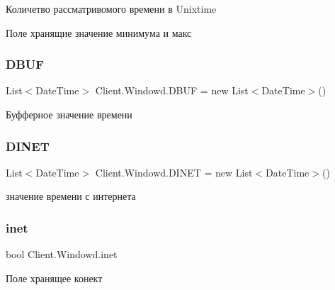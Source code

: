 Количетво рассматривомого времени в Unixtime 

Поле хранящие значение минимума и макс \hypertarget{class_client_1_1_windowd_ae56192c0587527c76b5878d3239768e4}{}\label{class_client_1_1_windowd_ae56192c0587527c76b5878d3239768e4} 
\subsubsection{\texorpdfstring{D\+B\+UF}{DBUF}}
{\footnotesize\ttfamily List$<$Date\+Time$>$ Client.\+Windowd.\+D\+B\+UF = new List$<$Date\+Time$>$()}



Буфферное значение времени 

\hypertarget{class_client_1_1_windowd_a98b5779ed4abf0571a16deb0c985a7a4}{}\label{class_client_1_1_windowd_a98b5779ed4abf0571a16deb0c985a7a4} 
\subsubsection{\texorpdfstring{D\+I\+N\+ET}{DINET}}
{\footnotesize\ttfamily List$<$Date\+Time$>$ Client.\+Windowd.\+D\+I\+N\+ET = new List$<$Date\+Time$>$()}



значение времени с интернета 

\hypertarget{class_client_1_1_windowd_a89f97a16687dad532281e065e70bd490}{}\label{class_client_1_1_windowd_a89f97a16687dad532281e065e70bd490} 
\subsubsection{\texorpdfstring{inet}{inet}}
{\footnotesize\ttfamily bool Client.\+Windowd.\+inet}



Поле хранящее конект 

\hypertarget{class_client_1_1_windowd_a18e884676837904afa8857d7abd6fc7b}{}\label{class_client_1_1_windowd_a18e884676837904afa8857d7abd6fc7b} 
